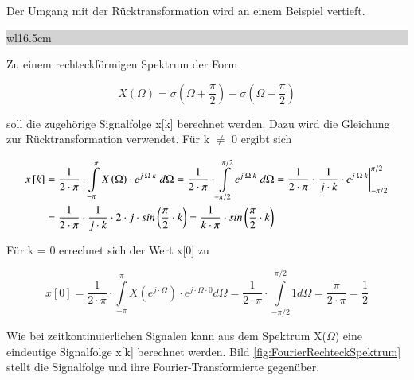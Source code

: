 \noindent Der Umgang mit der R\"{u}cktransformation wird an einem Beispiel vertieft.\bigskip

\noindent
\colorbox{lightgray}{%
%
\renewcommand\arraystretch{0.6}%
\begin{tabular}{ wl{16.5cm} }
{\selectfont{Beispiel: Inverse Fourier-Transformation diskreter Folgen}}
\end{tabular}%
}\medskip

\noindent Zu einem rechteckf\"{o}rmigen Spektrum der Form

\begin{equation}\label{eq:seventhirtynine}
X\left(\Omega \right)=\sigma \left(\Omega +\frac{\pi }{2} \right)-\sigma \left(\Omega -\frac{\pi }{2} \right)
\end{equation}

\noindent soll die zugeh\"{o}rige Signalfolge x[k] berechnet werden. Dazu wird die Gleichung zur R\"{u}cktransformation verwendet. F\"{u}r k $\mathrm{\neq}$ 0 ergibt sich

\begin{equation}\label{eq:sevenfourty}
\begin{split}
x\left[k\right] & =\frac{1}{2\cdot \pi } \cdot \int\limits _{-\pi }^{\pi }X\left(\Omega \right)\cdot e^{j\cdot \Omega \cdot k} {\rm \; }d\Omega  =\frac{1}{2\cdot \pi } \cdot \int\limits _{-\pi /2}^{\pi /2}e^{j\cdot \Omega \cdot k} {\rm \; }d\Omega  =\frac{1}{2\cdot \pi } \cdot \left. \frac{1}{j\cdot k} \cdot e^{j\cdot \Omega \cdot k} \right|_{-\pi /2}^{\pi /2} \\
&=\frac{1}{2\cdot \pi } \cdot \frac{1}{j\cdot k}\cdot 2\cdot j \cdot sin\left(\frac{\pi}{2}\cdot k\right)= \frac{1}{k\cdot \pi}\cdot sin\left(\frac{\pi}{2}\cdot k\right)
\end{split}
\end{equation}

\noindent F\"{u}r k = 0 errechnet sich der Wert x[0] zu

\begin{equation}\label{eq:sevenfourtyone}
x\left[0\right]=\frac{1}{2\cdot \pi } \cdot \int\limits _{-\pi }^{\pi }X\left(e^{j\cdot \Omega } \right)\cdot e^{j\cdot \Omega \cdot 0} d\Omega  =\frac{1}{2\cdot \pi } \cdot \int\limits _{-\pi /2}^{\pi /2}1 d\Omega  =\frac{\pi }{2\cdot \pi} =\frac{1}{2}
\end{equation}

\noindent Wie bei zeitkontinuierlichen Signalen kann aus dem Spektrum X($\Omega$) eine eindeutige Signalfolge x[k] berechnet werden. Bild \ref{fig:FourierRechteckSpektrum} stellt die Signalfolge und ihre Fourier-Transformierte gegen\"{u}ber.

